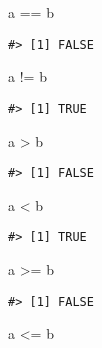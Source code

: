 \documentclass[
]{book}
\newenvironment{Shaded}{\begin{snugshade}}{\end{snugshade}}
\newcommand{\NormalTok}[1]{#1}
\newcommand{\SpecialCharTok}[1]{\textcolor[rgb]{0.00,0.00,0.00}{#1}}
\begin{document}
\begin{Shaded}
\begin{Highlighting}[]
\NormalTok{a }\SpecialCharTok{==}\NormalTok{ b}
\end{Highlighting}
\end{Shaded}

\begin{verbatim}
#> [1] FALSE
\end{verbatim}

\begin{Shaded}
\begin{Highlighting}[]
\NormalTok{a }\SpecialCharTok{!=}\NormalTok{ b}
\end{Highlighting}
\end{Shaded}

\begin{verbatim}
#> [1] TRUE
\end{verbatim}

\begin{Shaded}
\begin{Highlighting}[]
\NormalTok{a }\SpecialCharTok{\textgreater{}}\NormalTok{ b}
\end{Highlighting}
\end{Shaded}

\begin{verbatim}
#> [1] FALSE
\end{verbatim}

\begin{Shaded}
\begin{Highlighting}[]
\NormalTok{a }\SpecialCharTok{\textless{}}\NormalTok{ b}
\end{Highlighting}
\end{Shaded}

\begin{verbatim}
#> [1] TRUE
\end{verbatim}

\begin{Shaded}
\begin{Highlighting}[]
\NormalTok{a }\SpecialCharTok{\textgreater{}=}\NormalTok{ b}
\end{Highlighting}
\end{Shaded}

\begin{verbatim}
#> [1] FALSE
\end{verbatim}

\begin{Shaded}
\begin{Highlighting}[]
\NormalTok{a }\SpecialCharTok{\textless{}=}\NormalTok{ b}
\end{Highlighting}
\end{Shaded}
\end{document}
